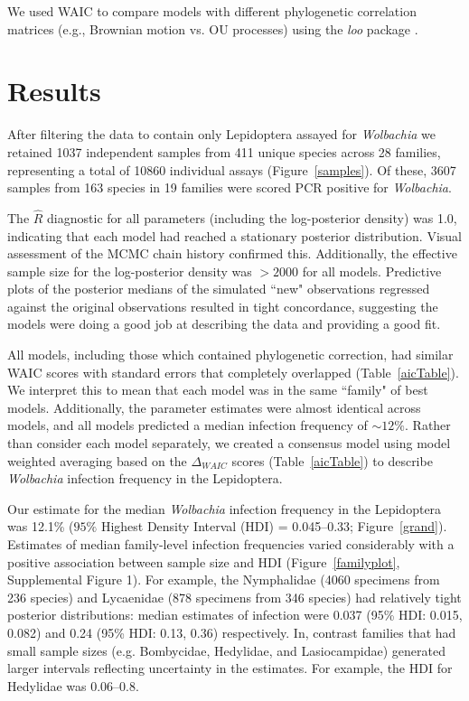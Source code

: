 \documentclass{frontiersSCNS}
\begin{document}
We used WAIC \citep[the widely applicable or Watanabe-Akaike information criterion;][]{Watanabe:2010aa,Gelman:2014aa} to compare models with different phylogenetic correlation matrices (e.g., Brownian motion vs. OU processes) using the \emph{loo} package \citep{Vehtari:2016aa}. 


\section{Results}
After filtering the \citet{Weinert:2015aa} data to contain only Lepidoptera assayed for \emph{Wolbachia} we retained 1037 independent samples from 411 unique species across 28 families, representing a total of 10860 individual assays (Figure~\ref{samples}). Of these, 3607 samples from 163 species in 19 families were scored PCR positive for \textit{Wolbachia}. 

The $\hat{R}$ diagnostic for all parameters (including the log-posterior density) was 1.0, indicating that each model had reached a stationary posterior distribution. Visual assessment of the MCMC chain history confirmed this. Additionally, the effective sample size for the log-posterior density was $> 2000$ for all models. Predictive plots of the posterior medians of the simulated ``new" observations regressed against the original observations resulted in tight concordance, suggesting the models were doing a good job at describing the data and providing a good fit. %

All models, including those which contained phylogenetic correction, had similar WAIC scores with standard errors that completely overlapped (Table~\ref{aicTable}). We interpret this to mean that each model was in the same ``family" of best models. Additionally, the parameter estimates were almost identical across models, and all models predicted a median infection frequency of $\sim 12\%$. Rather than consider each model separately, we created a consensus model using model weighted averaging based on the $\Delta_{WAIC}$ scores (Table~\ref{aicTable}) to describe \emph{Wolbachia} infection frequency in the Lepidoptera. 

Our estimate for the median \emph{Wolbachia} infection frequency in the Lepidoptera was 12.1\% ($95\%$ Highest Density Interval (HDI) = 0.045--0.33; Figure~\ref{grand}). Estimates of median family-level infection frequencies varied considerably with a positive association between sample size and HDI (Figure~\ref{familyplot}, Supplemental Figure 1). For example, the  Nymphalidae (4060 specimens from 236 species) and Lycaenidae (878 specimens from 346 species) had relatively tight posterior distributions: median estimates of infection were 0.037 (95\% HDI: 0.015, 0.082) and 0.24 (95\% HDI: 0.13, 0.36) respectively. In, contrast families that had small sample sizes (e.g. Bombycidae, Hedylidae, and Lasiocampidae) generated larger intervals reflecting uncertainty in the estimates. For example, the HDI for Hedylidae was 0.06--0.8.
\end{document}
